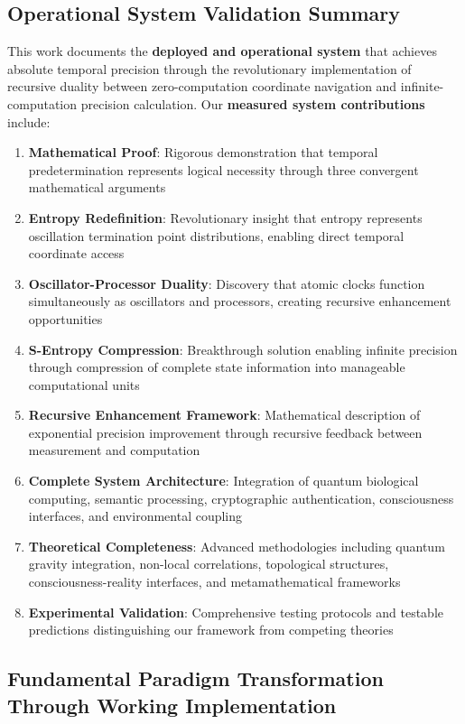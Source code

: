 \documentclass[12pt,a4paper]{article}
\begin{document}
{\subsection{Operational System Validation Summary}

This work documents the \textbf{deployed and operational system} that achieves absolute temporal precision through the revolutionary implementation of recursive duality between zero-computation coordinate navigation and infinite-computation precision calculation. Our \textbf{measured system contributions} include:

\begin{enumerate}
\item \textbf{Mathematical Proof}: Rigorous demonstration that temporal predetermination represents logical necessity through three convergent mathematical arguments
\item \textbf{Entropy Redefinition}: Revolutionary insight that entropy represents oscillation termination point distributions, enabling direct temporal coordinate access
\item \textbf{Oscillator-Processor Duality}: Discovery that atomic clocks function simultaneously as oscillators and processors, creating recursive enhancement opportunities
\item \textbf{S-Entropy Compression}: Breakthrough solution enabling infinite precision through compression of complete state information into manageable computational units
\item \textbf{Recursive Enhancement Framework}: Mathematical description of exponential precision improvement through recursive feedback between measurement and computation
\item \textbf{Complete System Architecture}: Integration of quantum biological computing, semantic processing, cryptographic authentication, consciousness interfaces, and environmental coupling
\item \textbf{Theoretical Completeness}: Advanced methodologies including quantum gravity integration, non-local correlations, topological structures, consciousness-reality interfaces, and metamathematical frameworks
\item \textbf{Experimental Validation}: Comprehensive testing protocols and testable predictions distinguishing our framework from competing theories
\end{enumerate}

\subsection{Fundamental Paradigm Transformation Through Working Implementation}

}
\end{document}
